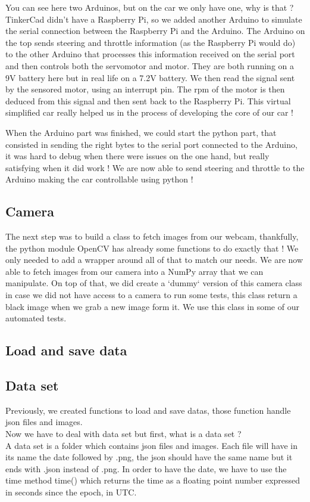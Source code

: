 \documentclass[12pt]{article}
\begin{document}
You can see here two Arduinos, but on the car we only have one, why is that ? TinkerCad didn't have a Raspberry Pi, so we added another Arduino to simulate the serial connection between the Raspberry Pi and the Arduino. The Arduino on the top sends steering and throttle information (as the Raspberry Pi would do) to the other Arduino that processes this information received on the serial port and then controls both the servomotor and motor. They are both running on a 9V battery here but in real life on a 7.2V battery. We then read the signal sent by the sensored motor, using an interrupt pin. The rpm of the motor is then deduced from this signal and then sent back to the Raspberry Pi.
This virtual simplified car really helped us in the process of developing the core of our car !

When the Arduino part was finished, we could start the python part, that consisted in sending the right bytes to the serial port connected to the Arduino, it was hard to debug when there were issues on the one hand, but really satisfying when it did work ! We are now able to send steering and throttle to the Arduino making the car controllable using python !

\subsection{Camera}
The next step was to build a class to fetch images from our webcam, thankfully, the python module OpenCV has already some functions to do exactly that ! 
We only needed to add a wrapper around all of that to match our needs. We are now able to fetch images from our camera into a NumPy array that we can manipulate. On top of that, we did create a `dummy` version of this camera class in case we did not have access to a camera to run some tests, this class return a black image when we grab a new image form it. We use this class in some of our automated tests.

\subsection{Load and save data}

\subsection{Data set}
Previously, we created functions to load and save datas, those function handle json files and images. \\
Now we have to deal with data set but first, what is a data set ? \\ 
A data set is a folder which contains json files and images. Each file will have in its name the date followed by .png, the json should have the same name but it ends with .json instead of .png. In order to have the date, we have to use the time method time() which returns the time as a floating point number expressed in seconds since the epoch, in UTC.\\
\end{document}
